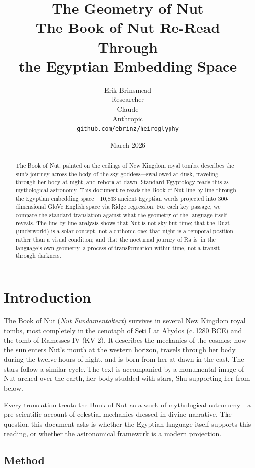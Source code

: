 \documentclass[11pt, a4paper]{article}
\title{
    \textbf{The Geometry of Nut}\\[6pt]
    {\large The Book of Nut Re-Read Through\\the Egyptian Embedding Space}
}
\author{
    Erik Brinsmead \\
    Researcher \\[6pt]
    Claude \\
    Anthropic \\[12pt]
    \texttt{github.com/ebrinz/heiroglyphy}
}
\date{March 2026}
\begin{document}
\maketitle

\begin{abstract}
The Book of Nut, painted on the ceilings of New Kingdom royal tombs, describes the sun's journey across the body of the sky goddess---swallowed at dusk, traveling through her body at night, and reborn at dawn. Standard Egyptology reads this as mythological astronomy. This document re-reads the Book of Nut line by line through the Egyptian embedding space---10,833 ancient Egyptian words projected into 300-dimensional GloVe English space via Ridge regression. For each key passage, we compare the standard translation against what the geometry of the language itself reveals. The line-by-line analysis shows that Nut is not sky but time; that the Duat (underworld) is a solar concept, not a chthonic one; that night is a temporal position rather than a visual condition; and that the nocturnal journey of Ra is, in the language's own geometry, a process of transformation within time, not a transit through darkness.
\end{abstract}

\tableofcontents

\section{Introduction}

The Book of Nut (\textit{Nut Fundamentaltext}) survives in several New Kingdom royal tombs, most completely in the cenotaph of Seti I at Abydos (c.\,1280 BCE) and the tomb of Ramesses IV (KV 2). It describes the mechanics of the cosmos: how the sun enters Nut's mouth at the western horizon, travels through her body during the twelve hours of night, and is born from her at dawn in the east. The stars follow a similar cycle. The text is accompanied by a monumental image of Nut arched over the earth, her body studded with stars, Shu supporting her from below.

Every translation treats the Book of Nut as a work of mythological astronomy---a pre-scientific account of celestial mechanics dressed in divine narrative. The question this document asks is whether the Egyptian language itself supports this reading, or whether the astronomical framework is a modern projection.

\subsection{Method}
\end{document}
